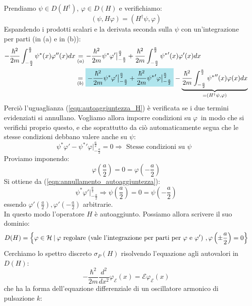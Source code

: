 \documentclass[../../FisicaTeorica.tex]{subfiles}
\begin{document}
Prendiamo $\psi \in D(H^\dag)$, $\varphi \in D(H)$ e verifichiamo:
\begin{equation}
(\psi, H\varphi) = (H^\dag \psi,\varphi)
\label{eqn:autoaggiuntezza_H}
\end{equation}
Espandendo i prodotti scalari e  la derivata seconda sulla $\psi$ con un'integrazione per parti (in (a) e in (b)):
\begin{align*}
-\frac{\hbar^2}{2m}\int_{-\frac{a}{2}}^{\frac{a}{2}} \psi^*(x) \varphi''(x)dx &\underset{(a)}{=} -\frac{\hbar^2}{2m}\psi^*\varphi' \big|_{-\frac{a}{2}}^{\frac{a}{2}} + \frac{\hbar^2}{2m}\int_{-\frac{a}{2}}^{\frac{a}{2}}{\psi^*}'(x)\varphi'(x)dx\\
&\underset{(b)}{=} \hlc{SkyBlue}{-\frac{\hbar^2}{2m}\psi^*\varphi'\big|_{-\frac{a}{2}}^{\frac{a}{2}}+\frac{\hbar^2}{2m}{\psi^*}'\varphi\big|_{-\frac{a}{2}}^{\frac{a}{2}}} - \underbrace{\frac{\hbar^2}{2m}\int_{-\frac{a}{2}}^{\frac{a}{2}}{\psi^*}''(x)\varphi(x)dx}_{=(H^\dag \psi,\varphi)}
\end{align*}
Perciò l'uguaglianza (\ref{eqn:autoaggiuntezza_H}) è verificata se i due termini evidenziati si annullano. Vogliamo allora imporre condizioni su $\varphi$\ in modo che si verifichi proprio questo, e che soprattutto da ciò automaticamente segua che le stesse condizioni debbano valere anche su $\psi$:
\begin{equation}
\psi^*\varphi'-{\psi^*}'\varphi\big|_{-\frac{a}{2}}^{\frac{a}{2}}=0\Rightarrow \text{ Stesse condizioni su $\psi$ }
\label{eqn:annullamento_autoaggiuntezza}
\end{equation}
Proviamo imponendo:
\[
\varphi\left(\frac{a}{2}\right)=0=\varphi\left(-\frac{a}{2}\right)
\]
Si ottiene da (\ref{eqn:annullamento_autoaggiuntezza}):
\[
\psi^*\varphi'\big|_{-\frac{a}{2}}^{\frac{a}{2}} \Rightarrow \psi\left(\frac{a}{2}\right)=0=\psi\left(-\frac{a}{2}\right)
\]
essendo $\varphi'\left(\frac{a}{2}\right), \varphi'\left(-\frac{a}{2}\right)$ arbitrarie.\\
In questo modo l'operatore $H$ è autoaggiunto. Possiamo allora scrivere il suo dominio:
\[
D(H)= \left \{\varphi \in \mathcal{H}\>|\> \varphi \text{ regolare (vale l'integrazione per parti per $\varphi$ e $\varphi'$) }, \varphi\left(\pm \frac{a}{2}\right) =  0\right \}
\]
Cerchiamo lo spettro discreto $\sigma_P(H)$ risolvendo l'equazione agli autovalori in $D(H)$:
\[
-\frac{\hbar^2}{2m}\frac{d^2}{dx^2}\varphi_{\mathcal{E}}(x) = \mathcal{E}\varphi_{\mathcal{E}}(x)
\]
che ha la forma dell'equazione differenziale di un oscillatore armonico di pulsazione $k$:
\end{document}
